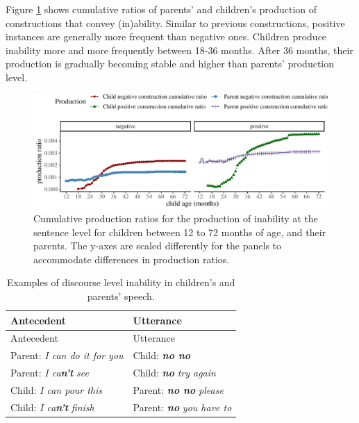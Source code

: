 \documentclass[
  man,floatsintext]{apa6}
\begin{document}
Figure \ref{fig:inability} shows cumulative ratios of parents' and children's production of constructions that convey (in)ability. Similar to previous constructions, positive instances are generally more frequent than negative ones. Children produce inability more and more frequently between 18-36 months. After 36 months, their production is gradually becoming stable and higher than parents' production level.

\begin{figure}[H]

{\centering \includegraphics{neg_construction_article_files/figure-latex/inability-1} 

}

\caption{Cumulative production ratios for the production of inability at the sentence level for children between 12 to 72 months of age, and their parents. The y-axes are scaled differently for the panels to accommodate differences in production ratios.}\label{fig:inability}
\end{figure}

\begin{longtable}[]{@{}ll@{}}
\caption{\label{tab:disinability} Examples of discourse level inability in children's and parents' speech.}\tabularnewline
\toprule\noalign{}
Antecedent & Utterance \\
\midrule\noalign{}
\endfirsthead
\toprule\noalign{}
Antecedent & Utterance \\
\midrule\noalign{}
\endhead
\bottomrule\noalign{}
\endlastfoot
Parent: \emph{I can do it for you} & Child: \textbf{\emph{no no}} \\
Parent: \emph{I ca\textbf{n't}} \emph{see} & Child: \textbf{\emph{no}} \emph{try again} \\
Child: \emph{I can pour this} & Parent: \textbf{\emph{no no}} \emph{please} \\
Child: \emph{I ca\textbf{n't}} \emph{finish} & Parent: \textbf{\emph{no}} \emph{you have to} \\
\end{longtable}
\end{document}

